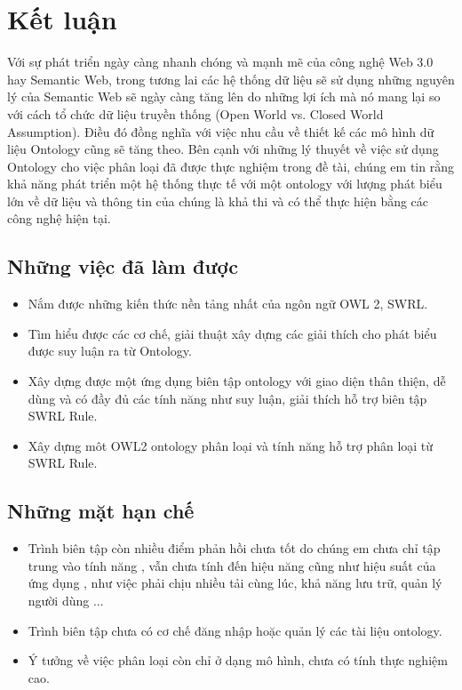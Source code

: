 \chapter{Kết luận}
Với sự phát triển ngày càng nhanh chóng và mạnh mẽ của công nghệ Web 3.0 hay Semantic Web, trong tương lai các hệ thống dữ liệu sẽ sử dụng những nguyên lý của Semantic Web sẽ ngày càng tăng lên do những lợi ích mà nó mang lại so với cách tổ chức dữ liệu truyền thống (Open World vs. Closed World Assumption). Điều đó đồng nghĩa với việc nhu cầu về thiết kế các mô hình dữ liệu Ontology cũng sẽ tăng theo. Bên cạnh với những lý thuyết về việc sử dụng Ontology cho việc phân loại đã được thực nghiệm trong đề tài, chúng em tin rằng khả năng phát triển một hệ thống thực tế với một ontology với lượng phát biểu lớn về dữ liệu và thông tin của chúng là khả thi và có thể thực hiện bằng các công nghệ hiện tại.
\section{Những việc đã làm được}
\begin{itemize}
\item Nắm được những kiến thức nền tảng nhất của ngôn ngữ OWL 2, SWRL.
\item Tìm hiểu được các cơ chế, giải thuật xây dựng các giải thích cho phát biểu được suy luận ra từ Ontology.
\item Xây dựng được một ứng dụng biên tập ontology với giao diện thân thiện, dễ dùng và có đầy đủ các tính năng như suy luận, giải thích hỗ trợ biên tập SWRL Rule.
\item Xây dựng môt OWL2 ontology phân loại và tính năng hỗ trợ phân loại từ SWRL Rule.
\end{itemize}
\section{Những mặt hạn chế}
\begin{itemize}
\item Trình biên tập còn nhiều điểm phản hồi chưa tốt do chúng em chưa chỉ tập trung vào tính năng , vẫn chưa tính đến hiệu năng cũng như hiệu suất của ứng dụng , như việc phải chịu nhiều tải cùng lúc, khả năng lưu trữ, quản lý người dùng ...
\item Trình biên tập chưa có cơ chế đăng nhập hoặc quản lý các tài liệu ontology.
\item Ý tưởng về việc phân loại còn chỉ ở dạng mô hình, chưa có tính thực nghiệm cao.
\end{itemize}
